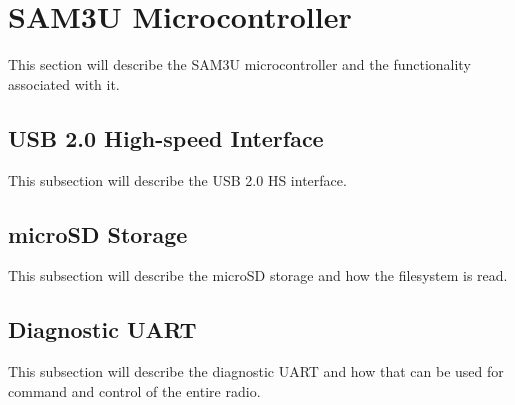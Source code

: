 \section{SAM3U Microcontroller} %
    This section will describe the SAM3U microcontroller and the functionality associated with it.
    
    \subsection{USB 2.0 High-speed Interface} %
        This subsection will describe the USB 2.0 HS interface.
    
    \subsection{microSD Storage} %
        This subsection will describe the microSD storage and how the filesystem is read.
    
    \subsection{Diagnostic UART} %
        This subsection will describe the diagnostic UART and how that can be used for command
        and control of the entire radio.
